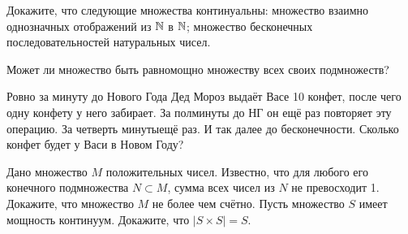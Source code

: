\documentclass[a4paper,12pt]{article}
\begin{document}


Докажите, что следующие множества континуальны:
множество взаимно однозначных отображений из $\mathbb{N}$ в $\mathbb{N}$;
множество бесконечных последовательностей натуральных чисел.


Может ли множество быть равномощно множеству всех своих подмножеств?

Ровно за минуту до Нового Года Дед Мороз выдаёт Васе 10 конфет, после чего одну конфету у него забирает. За полминуты до НГ он ещё раз повторяет эту операцию. За четверть минуты\т ещё раз. И так далее до бесконечности. Сколько конфет будет у Васи в Новом Году?

Дано множество $M$ положительных чисел. Известно, что для любого его конечного подмножества $N \subset M$, сумма всех чисел из $N$ не превосходит 1. Докажите, что множество $M$ не более чем счётно.
Пусть множество $S$ имеет мощность континуум. Докажите, что $|S \times S| = S$.

\vfill
{}


\end{document}
